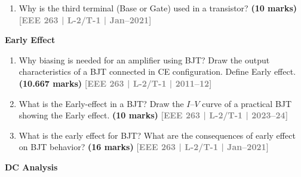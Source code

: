 \documentclass[12pt,a4paper]{article}
\newcommand{\yr}[1]{\hfill\textcolor{gray}{\small\textbf{[#1]}}}
\newcommand{\mk}[1]{\textcolor{orange!70!black}{\small\textbf{(#1 marks)}}}
\newcommand{\subtopic}[2]{%
  \vspace{10pt}
  \noindent\begin{tcolorbox}[colback=#1!8,colframe=#1,boxrule=0.6pt,arc=4pt,
    left=6pt,right=6pt,top=4pt,bottom=4pt]
    \small\bfseries\textcolor{#1}{#2}
  \end{tcolorbox}
  \vspace{2pt}
}
\begin{document}
\begin{enumerate}


\item Why is the third terminal (Base or Gate) used in a transistor?
\mk{10} \yr{EEE 263 | L-2/T-1 | Jan--2021}

\end{enumerate}

\subtopic{cA}{Early Effect}
\label{sub:s2-early}

\begin{enumerate}

\item Why biasing is needed for an amplifier using BJT? Draw the output characteristics of a BJT connected in CE configuration. Define Early effect.
\mk{10.667} \yr{EEE 263 | L-2/T-1 | 2011--12}

\item What is the Early-effect in a BJT? Draw the $I$--$V$ curve of a practical BJT showing the Early effect.
\mk{10} \yr{EEE 263 | L-2/T-1 | 2023--24}

\item What is the early effect for BJT? What are the consequences of early effect on BJT behavior?
\mk{16} \yr{EEE 263 | L-2/T-1 | Jan--2021}

\end{enumerate}

\subtopic{cA}{DC Analysis}
\label{sub:s2-dc}
\end{document}
